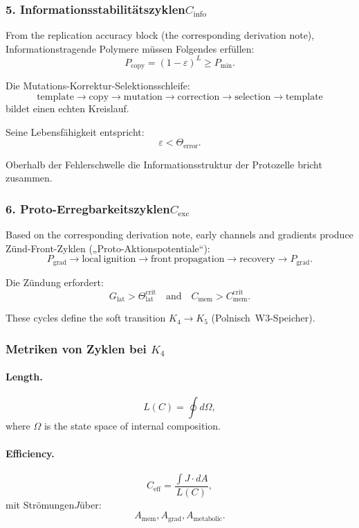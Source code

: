 \subsubsection{5. Informationsstabilitätszyklen$C_{\mathrm{info}}$}

From the replication accuracy block (the corresponding derivation note),
Informationstragende Polymere müssen Folgendes erfüllen:
\[
  P_{\mathrm{copy}}=(1-\varepsilon)^L \ge P_{\min}.
\]

Die Mutations-Korrektur-Selektionsschleife:
\[
  \mathrm{template}
  \to \mathrm{copy}
  \to \mathrm{mutation}
  \to \mathrm{correction}
  \to \mathrm{selection}
  \to \mathrm{template}
\]
bildet einen echten Kreislauf.

Seine Lebensfähigkeit entspricht:
\[
  \varepsilon < \Theta_{\mathrm{error}}.
\]

Oberhalb der Fehlerschwelle die Informationsstruktur der Protozelle
bricht zusammen.

\subsubsection{6. Proto-Erregbarkeitszyklen$C_{\mathrm{exc}}$}

Based on the corresponding derivation note, early channels and gradients produce
Zünd-Front-Zyklen („Proto-Aktionspotentiale“):
\[
  P_{\mathrm{grad}} \to
  \mathrm{local\ ignition} \to
  \mathrm{front\ propagation} \to
  \mathrm{recovery} \to
  P_{\mathrm{grad}}.
\]

Die Zündung erfordert:
\[
  G_{\mathrm{lat}} > \Theta^{\mathrm{crit}}_{\mathrm{lat}}
\quad\text{and}\quad
  C_{\mathrm{mem}}>C_{\mathrm{mem}}^{\mathrm{crit}}.
\]

These cycles define the soft transition $K_4\to K_5$
(Polnisch~W3-Speicher).

\subsubsection{Metriken von Zyklen bei \texorpdfstring{$K_4$}{K_4}}

\paragraph{Length.}
\[
  L(C)=\oint d\Omega,
\]
where $\Omega$ is the state space of internal composition.

\paragraph{Efficiency.}
\[
  C_{\mathrm{eff}}
    =\frac{\int J\cdot dA}{L(C)},
\]
mit Strömungen$J$über:
\[
  A_{\mathrm{mem}}, A_{\mathrm{grad}}, A_{\mathrm{metabolic}}.
\]

